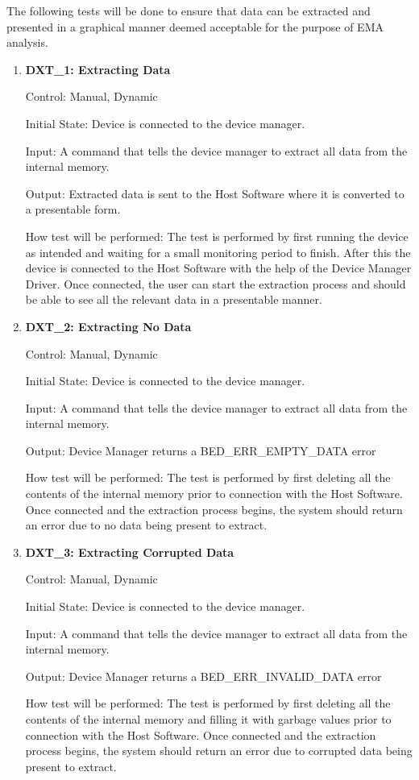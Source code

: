 \documentclass[12pt, titlepage]{article}
\begin{document}
The following tests will be done to ensure that data can be extracted and presented in a graphical manner deemed acceptable for the purpose of EMA analysis.
\begin{enumerate}
	\item{\textbf{DXT\_1: Extracting Data} \\}\label{DXT1}
	
		Control: Manual, Dynamic
							
		Initial State: Device is connected to the device manager.
							
		Input: A command that tells the device manager to extract all data from the internal memory.
		
		Output: Extracted data is sent to the Host Software where it is converted to a presentable form.

		How test will be performed: The test is performed by first running the device as intended and waiting for a small monitoring period to finish. After this the device is connected to the Host Software with the 				help of the Device Manager Driver. Once connected, the user can start the extraction process and should be able to see all the relevant data in a presentable manner.
		
	\item{\textbf{DXT\_2: Extracting No Data} \\}\label{DXT2}
	
		Control: Manual, Dynamic
							
		Initial State: Device is connected to the device manager.
							
		Input: A command that tells the device manager to extract all data from the internal memory.
		
		Output: Device Manager returns a BED\_ERR\_EMPTY\_DATA error

		How test will be performed: The test is performed by first deleting all the contents of the internal memory prior to connection with the Host Software. Once connected and the extraction process begins, the 				system should return an error due to no data being present to extract.

	\item{\textbf{DXT\_3: Extracting Corrupted Data} \\}\label{DXT3}
	
		Control: Manual, Dynamic
							
		Initial State: Device is connected to the device manager.
							
		Input: A command that tells the device manager to extract all data from the internal memory.
		
		Output: Device Manager returns a BED\_ERR\_INVALID\_DATA error

		How test will be performed: The test is performed by first deleting all the contents of the internal memory and filling it with garbage values prior to connection with the Host Software. Once connected and 				the extraction process begins, the system should return an error due to corrupted data being present to extract.
\end{enumerate}
\end{document}
